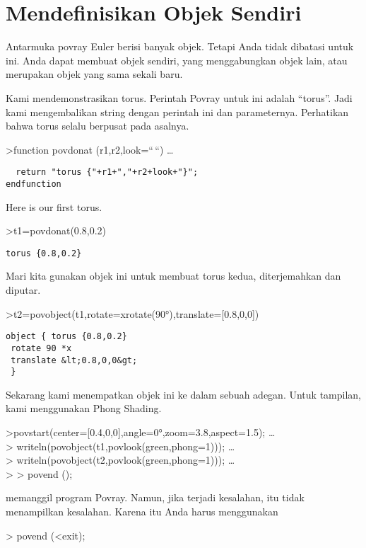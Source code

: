 \documentclass[
]{book}
\begin{document}
\chapter{Mendefinisikan Objek Sendiri}\label{mendefinisikan-objek-sendiri}

Antarmuka povray Euler berisi banyak objek. Tetapi Anda tidak dibatasi untuk ini. Anda dapat membuat objek sendiri, yang menggabungkan objek lain, atau merupakan objek yang sama sekali baru.

Kami mendemonstrasikan torus. Perintah Povray untuk ini adalah ``torus''. Jadi kami mengembalikan string dengan perintah ini dan parameternya. Perhatikan bahwa torus selalu berpusat pada asalnya.

\textgreater function povdonat (r1,r2,look=``\,``) \ldots{}

\begin{verbatim}
  return "torus {"+r1+","+r2+look+"}";
endfunction
\end{verbatim}

Here is our first torus.

\textgreater t1=povdonat(0.8,0.2)

\begin{verbatim}
torus {0.8,0.2}
\end{verbatim}

Mari kita gunakan objek ini untuk membuat torus kedua, diterjemahkan dan diputar.

\textgreater t2=povobject(t1,rotate=xrotate(90°),translate={[}0.8,0,0{]})

\begin{verbatim}
object { torus {0.8,0.2}
 rotate 90 *x 
 translate &lt;0.8,0,0&gt;
 }
\end{verbatim}

Sekarang kami menempatkan objek ini ke dalam sebuah adegan. Untuk tampilan, kami menggunakan Phong Shading.

\textgreater povstart(center={[}0.4,0,0{]},angle=0°,zoom=3.8,aspect=1.5); \ldots{}\\
\textgreater{} writeln(povobject(t1,povlook(green,phong=1))); \ldots{}\\
\textgreater{} writeln(povobject(t2,povlook(green,phong=1))); \ldots{}\\
\textgreater{} \textgreater{} povend ();

memanggil program Povray. Namun, jika terjadi kesalahan, itu tidak menampilkan kesalahan. Karena itu Anda harus menggunakan

\textgreater{} povend (\textless exit);
\end{document}
